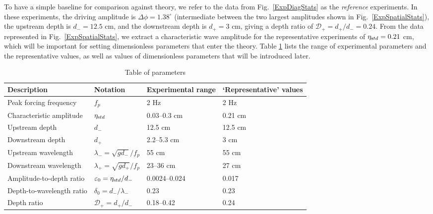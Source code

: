 \documentclass[11pt]{article}
\newcommand{\eps}{\varepsilon}
\newcommand{\etastd}{\eta_{\text std}}
\newcommand{\depth}{d}
\newcommand{\dup}{\depth_{-}}
\newcommand{\ddn}{\depth_{+}}
\newcommand{\lam}{\lambda}
\newcommand{\lamup}{\lam_{-}}
\newcommand{\lamdn}{\lam_{+}}
\newcommand{\drat}{\mathcal{D}}
\newcommand{\dratdn}{\drat_+}
\newcommand{\Dphi}{\Delta \phi}
\newcommand{\epsup}{\eps_0}
\newcommand{\delup}{\delta_0}
\begin{document}
To have a simple baseline for comparison against theory, we refer to the data from Fig.~\ref{ExpDiagStats} as the {\em reference} experiments. In these experiments, the driving amplitude is $\Dphi = 1.38^{\circ}$ (intermediate between the two largest amplitudes shown in Fig.~\ref{ExpSpatialStats}), the upstream depth is $\dup = 12.5$ cm, and the downstream depth is $\ddn = 3$ cm, giving a depth ratio of $\dratdn = \ddn/\dup= 0.24$. From the data represented in Fig.~\ref{ExpSpatialStats}, we extract a characteristic wave amplitude for the representative experiments of $\etastd = 0.21$ cm, which will be important for setting dimensionless parameters that enter the theory. Table \ref{paramtable} lists the range of experimental parameters and the representative values, as well as values of dimensionless parameters that will be introduced later.

\begin{table}[h]%
\begin{center}
\caption{Table of parameters}
\label{paramtable}
\begin{tabular}{l l l l}
\hline Description & Notation & Experimental range & `Representative' values \\
\hline
Peak forcing frequency	& $f_p$					& 2 Hz 		& 2 Hz \\
Characteristic amplitude	& $\etastd$				& 0.03--0.3 cm	& 0.21 cm \\
Upstream depth		& $\dup$					& 12.5 cm 	& 12.5 cm \\
Downstream depth		& $\ddn$					& 2.2--5.3 cm	& 3 cm \\
Upstream wavelength	& $\lamup = \sqrt{g \dup}/f_p$	& 55 cm 		& 55 cm \\
Downstream wavelength	& $\lamdn = \sqrt{g \ddn}/f_p$	& 23--36 cm	& 27 cm \\
%
Amplitude-to-depth ratio	& $\epsup = \etastd / \dup$	&0.0024--0.024	& 0.017 \\
Depth-to-wavelength ratio	& $\delup = \dup / \lamup$	& 0.23		& 0.23 \\
Depth ratio			& $\dratdn = \ddn/\dup$		& 0.18--0.42	& 0.24
\end{tabular}
\end{center}
\end{table}


\end{document}
